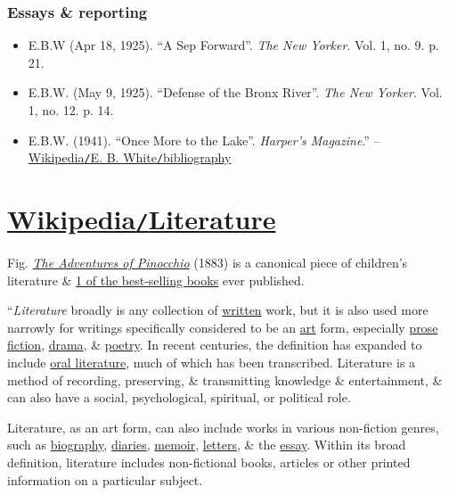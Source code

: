 \documentclass[oneside]{book}
\numberwithin{equation}{section}
\begin{document}
\subsubsection{Essays \& reporting}
\begin{itemize}
	\item E.B.W (Apr 18, 1925). ``A Sep Forward''. \textit{The New Yorker}. Vol. 1, no. 9. p. 21.
	\item E.B.W. (May 9, 1925). ``Defense of the Bronx River''. \textit{The New Yorker}. Vol. 1, no. 12. p. 14.
	\item E.B.W. (1941). ``Once More to the Lake''. \textit{Harper's Magazine}.'' -- \href{https://en.wikipedia.org/wiki/E._B._White#Bibliography}{Wikipedia\texttt{/}E. B. White\texttt{/}bibliography}
\end{itemize}


\section{\href{https://en.wikipedia.org/wiki/Literature}{Wikipedia\texttt{/}Literature}}
\textsf{Fig. \href{https://en.wikipedia.org/wiki/The_Adventures_of_Pinocchio}{\textit{The Adventures of Pinocchio}} (1883) is a canonical piece of children's literature \& \href{https://en.wikipedia.org/wiki/List_of_best-selling_books}{1 of the best-selling books} ever published.}

``\textit{Literature} broadly is any collection of \href{https://en.wikipedia.org/wiki/Writing}{written} work, but it is also used more narrowly for writings specifically considered to be an \href{https://en.wikipedia.org/wiki/Art}{art} form, especially \href{https://en.wikipedia.org/wiki/Prose}{prose} \href{https://en.wikipedia.org/wiki/Fiction}{fiction}, \href{https://en.wikipedia.org/wiki/Drama}{drama}, \& \href{https://en.wikipedia.org/wiki/Poetry}{poetry}. In recent centuries, the definition has expanded to include \href{https://en.wikipedia.org/wiki/Oral_literature}{oral literature}, much of which has been transcribed. Literature is a method of recording, preserving, \& transmitting knowledge \& entertainment, \& can also have a social, psychological, spiritual, or political role.

Literature, as an art form, can also include works in various non-fiction genres, such as \href{https://en.wikipedia.org/wiki/Biography}{biography}, \href{https://en.wikipedia.org/wiki/Diary}{diaries}, \href{https://en.wikipedia.org/wiki/Memoir}{memoir}, \href{https://en.wikipedia.org/wiki/Letter_(message)}{letters}, \& the \href{https://en.wikipedia.org/wiki/Essay}{essay}. Within its broad definition, literature includes non-fictional books, articles or other printed information on a particular subject.
\end{document}
